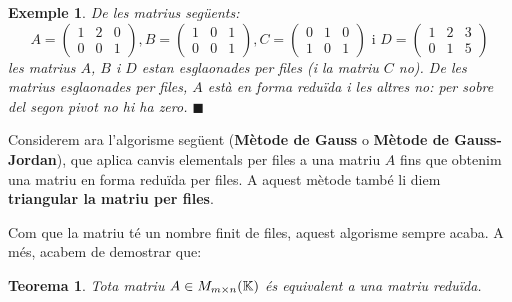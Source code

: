 \documentclass[
  11pt,
]{book}
\numberwithin{dummy}{section}
\theoremstyle{maincolornumbox}
\newtheorem{theorem}{TTTT}[chapter]
\newtheorem{theoremeT}{Teorema}[chapter]
\theoremstyle{blacknumex}
\newtheorem{exampleT}{Exemple}[chapter]
\theoremstyle{blacknumbox}
\theoremstyle{maincolornum}
\renewenvironment{theorem}{\begin{tBox}\begin{theoremeT}}{\end{theoremeT}\end{tBox}}
\newenvironment{example}{\begin{exampleT}}{\hfill{\tiny\ensuremath{\blacksquare}}\end{exampleT}}
\begin{document}
\begin{example}
De les matrius següents: \[A=\begin{pmatrix}
    1 & 2 & 0 \\ 0 & 0 & 1
    \end{pmatrix},
    B=\begin{pmatrix}
    1 & 0 & 1 \\ 0 & 0 & 1
    \end{pmatrix},
    C=\begin{pmatrix}
    0 & 1 & 0 \\ 1 & 0 & 1
    \end{pmatrix} \text{ i }
    D = \begin{pmatrix}
    1&2&3\\
    0&1&5
    \end{pmatrix}\] les matrius \(A\), \(B\) i \(D\) estan esglaonades per files
(i la matriu \(C\) no). De les matrius esglaonades per files, \(A\) està en
forma reduïda i les altres no: per sobre del segon pivot no hi ha zero.
\end{example}

Considerem ara l'algorisme següent (\textbf{Mètode de Gauss} o \textbf{Mètode de
Gauss-Jordan}), que aplica canvis elementals per files a una matriu \(A\)
fins que obtenim una matriu en forma reduïda per files. A aquest mètode
també li diem \textbf{triangular la matriu per files}.

Com que la matriu té un nombre finit de files, aquest algorisme sempre
acaba. A més, acabem de demostrar que:

\begin{theorem}
Tota matriu \(A\in M_{m\times n}(\mathbb{K})\) és equivalent a una matriu reduïda.
\end{theorem}
\end{document}
